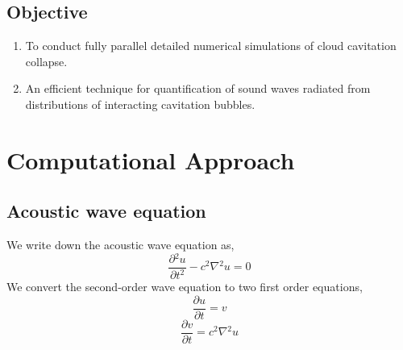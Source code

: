 \documentclass[12pt]{article}
\begin{document}
\subsection*{Objective}
\begin{enumerate}
	\item To conduct fully parallel detailed numerical simulations of cloud cavitation collapse.
    \item An efficient technique for quantification of sound waves radiated from distributions of interacting cavitation bubbles.
\end{enumerate}
\section*{Computational Approach}
\subsection*{Acoustic wave equation}
We write down the acoustic wave equation as,
\begin{equation}\label{2nd order wave}
	\frac{\partial{}^{2}{u}}{\partial{t}^{2}}- c^{2}\nabla{}^{2}{u}=0
\end{equation}  
We convert the second-order wave equation to two first order equations,
\begin{equation}\label{u update}
    \frac{\partial{u}}{\partial{t}}=v
\end{equation}
\begin{equation}\label{v update}
    \frac{\partial{v}}{\partial{t}}= c^{2}\nabla{}^{2}{u}
\end{equation}
\end{document}
